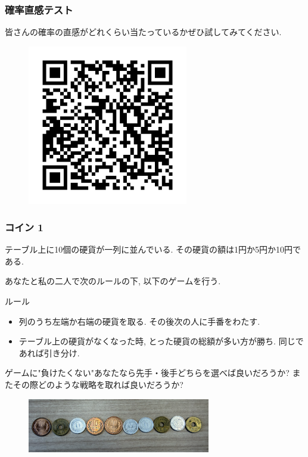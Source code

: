 \documentclass[11pt,dvipdfmx]{beamer}
\theoremstyle{definition}
\theoremstyle{remark}
\begin{document}
\begin{frame}
\frametitle{確率直感テスト}

皆さんの確率の直感がどれくらい当たっているかぜひ試してみてください. 

\begin{figure}[htbp]
\begin{center}
\includegraphics[width=70mm]{prob.png}
\end{center}
\end{figure}
\end{frame}


\begin{frame}
\frametitle{コイン 1}
テーブル上に10個の硬貨が一列に並んでいる. 
その硬貨の額は1円か5円か10円である. 

あなたと私の二人で次のルールの下, 以下のゲームを行う.

 \begin{block}{ルール}
\begin{itemize}
\item 列のうち左端か右端の硬貨を取る. その後次の人に手番をわたす.
\item テーブル上の硬貨がなくなった時, とった硬貨の総額が多い方が勝ち. 同じであれば引き分け. 
\end{itemize}
   \end{block}

ゲームに"負けたくない"あなたなら先手・後手どちらを選べば良いだろうか?
またその際どのような戦略を取れば良いだろうか?

\begin{figure}[htbp]
\begin{center}
\includegraphics[width=80mm]{coin1.png}
\end{center}
\end{figure}

\end{frame}
\end{document}
